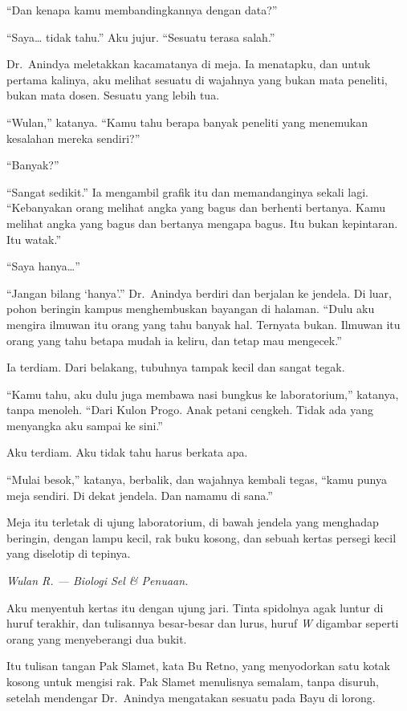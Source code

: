\documentclass[11pt,twoside,openany]{book}
\makeatletter
\newcommand{\scenebreak}{\par\vspace{0.9em}{\centering\textsc{*\hspace{0.7em}*\hspace{0.7em}*}\par}\vspace{0.9em}\@afterindentfalse\@afterheading}
\makeatother
\begin{document}
``Dan kenapa kamu membandingkannya dengan data?''

``Saya\ldots{} tidak tahu.'' Aku jujur. ``Sesuatu terasa salah.''

Dr.~Anindya meletakkan kacamatanya di meja. Ia menatapku, dan untuk pertama kalinya, aku melihat sesuatu di wajahnya yang bukan mata peneliti, bukan mata dosen. Sesuatu yang lebih tua.

``Wulan,'' katanya. ``Kamu tahu berapa banyak peneliti yang menemukan kesalahan mereka sendiri?''

``Banyak?''

``Sangat sedikit.'' Ia mengambil grafik itu dan memandanginya sekali lagi. ``Kebanyakan orang melihat angka yang bagus dan berhenti bertanya. Kamu melihat angka yang bagus dan bertanya mengapa bagus. Itu bukan kepintaran. Itu watak.''

``Saya hanya\ldots{}''

``Jangan bilang `hanya'.'' Dr.~Anindya berdiri dan berjalan ke jendela. Di luar, pohon beringin kampus menghembuskan bayangan di halaman. ``Dulu aku mengira ilmuwan itu orang yang tahu banyak hal. Ternyata bukan. Ilmuwan itu orang yang tahu betapa mudah ia keliru, dan tetap mau mengecek.''

Ia terdiam. Dari belakang, tubuhnya tampak kecil dan sangat tegak.

``Kamu tahu, aku dulu juga membawa nasi bungkus ke laboratorium,'' katanya, tanpa menoleh. ``Dari Kulon Progo. Anak petani cengkeh. Tidak ada yang menyangka aku sampai ke sini.''

Aku terdiam. Aku tidak tahu harus berkata apa.

``Mulai besok,'' katanya, berbalik, dan wajahnya kembali tegas, ``kamu punya meja sendiri. Di dekat jendela. Dan namamu di sana.''

\scenebreak
Meja itu terletak di ujung laboratorium, di bawah jendela yang menghadap beringin, dengan lampu kecil, rak buku kosong, dan sebuah kertas persegi kecil yang diselotip di tepinya.

\emph{Wulan R. --- Biologi Sel \& Penuaan.}

Aku menyentuh kertas itu dengan ujung jari. Tinta spidolnya agak luntur di huruf terakhir, dan tulisannya besar-besar dan lurus, huruf \emph{W} digambar seperti orang yang menyeberangi dua bukit.

Itu tulisan tangan Pak Slamet, kata Bu Retno, yang menyodorkan satu kotak kosong untuk mengisi rak. Pak Slamet menulisnya semalam, tanpa disuruh, setelah mendengar Dr.~Anindya mengatakan sesuatu pada Bayu di lorong.
\end{document}
